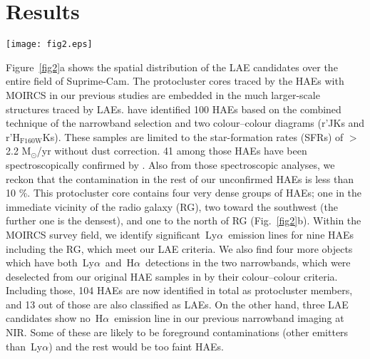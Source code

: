 \documentclass[letters,usenatbib]{mnras}
\def\lya{{\rm\,Ly$\alpha$}}
\def\ha{{\rm\,H$\alpha$}}
\def\msun{{\rm M}$_{\odot}$}
\begin{document}
\section{Results} 

\begin{figure*}
	\texttt{[image: fig2.eps]}
    \caption{The 2-D maps of USS~1558 protocluster with Suprime-Cam (a: left) and 
    with MOIRCS (b: right). (a) The black crosses represent the LAE candidates, 
    and the blue circles indicate the HAEs identified by \citet{Hayashi:2016}. The 
    filled contours indicate the significance of LAE overdensities (0--$\sigma$, 
    $\sigma$--$2\sigma$, $2\sigma$--$3\sigma$, and $3\sigma$--$4\sigma$), which 
    are smoothed by the Gaussian kernel of $\sigma=1$ degree. The region enclosed 
    by the black lines corresponds to the survey field of MOIRCS for HAEs. (b) The 
    symbols are the same as shown in the left panel, but the purple crosses show 
    the dual \ha\ and \lya\ emitters. The star symbol indicates the RG. The filled 
    contours shows the mean distance of, 200--150, 150--100, and $<$100 ph-kpc 
    (physical kpc), smoothed by the Gaussian kernel of $\sigma=0.5$ arcmin.}
    \label{fig2}
\end{figure*}

Figure~\ref{fig2}a shows the spatial distribution of the LAE candidates over the 
entire field of Suprime-Cam. The protocluster cores traced by the HAEs with MOIRCS 
in our previous studies \citep{Hayashi:2012,Hayashi:2016} are embedded in the much 
larger-scale structures traced by LAEs. \citet{Hayashi:2016} have identified 100 
HAEs based on the combined technique of the narrowband selection and two 
colour--colour diagrams (r'JKs and r'H$_\mathrm{F160W}$Ks). These samples are 
limited to the star-formation rates (SFRs) of $>$2.2 \msun/yr without dust 
correction. 41 among those HAEs have been spectroscopically confirmed by 
\citet{Shimakawa:2014,Shimakawa:2015b}. Also from those spectroscopic analyses, we 
reckon that the contamination in the rest of our unconfirmed HAEs is less than 10 
\%. This protocluster core contains four very dense groups of HAEs; one in the 
immediate vicinity of the radio galaxy (RG), two toward the southwest (the further 
one is the densest), and one to the north of RG (Fig.~\ref{fig2}b). Within the 
MOIRCS survey field, we identify significant \lya\ emission lines for nine HAEs 
including the RG, which meet our LAE criteria. We also find four more objects 
which have both \lya\ and \ha\ detections in the two narrowbands, which were 
deselected from our original HAE samples in \citet{Hayashi:2016} by their 
colour--colour criteria. Including those, 104 HAEs are now identified in total as 
protocluster members, and 13 out of those are also classified as LAEs. On the 
other hand, three LAE candidates show no \ha\ emission line in our previous 
narrowband imaging at NIR.  Some of these are likely to be foreground 
contaminations (other emitters than \lya) and the rest would be too faint HAEs.
\end{document}
